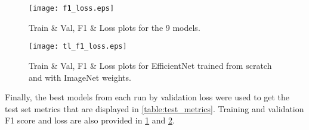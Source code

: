 \documentclass[10pt,twocolumn,letterpaper]{article}
\begin{document}
\begin{table*}[tbh]
  \centering
  \boldmath
  \caption{F1 (higher is better), time per epoch in seconds (lower is better), and number of epochs to reach the best validation loss (lower is better) for the 12 models that were trained.}
  \label{table:test_metrics}
  \end{table*}
  
  \begin{figure}[t]
    \centering
    \texttt{[image: f1\_loss.eps]}  
     \caption{Train \& Val, F1 \& Loss plots for the 9 models.}
     \label{fig:acc_loss_sep}
  \end{figure}
  
  \begin{figure}[t]
    \centering
    \texttt{[image: tl\_f1\_loss.eps]}  
     \caption{Train \& Val, F1 \& Loss plots for EfficientNet trained from scratch and with ImageNet weights.}
     \label{fig:tl_acc_loss}
  \end{figure}

Finally, the best models from each run by validation loss were used to get the test set metrics that 
are displayed in \cref{table:test_metrics}. Training and validation F1 score and loss are also provided in 
\cref{fig:acc_loss_sep} and \cref{fig:tl_acc_loss}.
\end{document}
